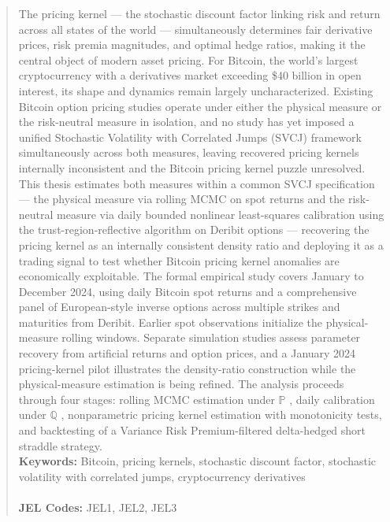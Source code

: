 \begin{abstract}
\noindent 
The pricing kernel — the stochastic discount factor linking risk and return across all states of the world — simultaneously determines fair derivative prices, risk premia magnitudes, and optimal hedge ratios, making it the central object of modern asset pricing. For Bitcoin, the world's largest cryptocurrency with a derivatives market exceeding \$40 billion in open interest, its shape and dynamics remain largely uncharacterized. Existing Bitcoin option pricing studies operate under either the physical measure or the risk-neutral measure in isolation, and no study has yet imposed a unified Stochastic Volatility with Correlated Jumps (SVCJ) framework simultaneously across both measures, leaving recovered pricing kernels internally inconsistent and the Bitcoin pricing kernel puzzle unresolved. This thesis estimates both measures within a common SVCJ specification — the physical measure via rolling MCMC on spot returns and the risk-neutral measure via daily bounded nonlinear least-squares calibration using the trust-region-reflective algorithm on Deribit options — recovering the pricing kernel as an internally consistent density ratio and deploying it as a trading signal to test whether Bitcoin pricing kernel anomalies are economically exploitable. The formal empirical study covers January to December 2024, using daily Bitcoin spot returns and a comprehensive panel of European-style inverse options across multiple strikes and maturities from Deribit. Earlier spot observations initialize the physical-measure rolling windows. Separate simulation studies assess parameter recovery from artificial returns and option prices, and a January 2024 pricing-kernel pilot illustrates the density-ratio construction while the physical-measure estimation is being refined. The analysis proceeds through four stages: rolling MCMC estimation under $\mathbb{P}$
, daily calibration under $\mathbb{Q}$
, nonparametric pricing kernel estimation with monotonicity tests, and backtesting of a Variance Risk Premium-filtered delta-hedged short straddle strategy.
\vspace{0in}\\
\noindent\textbf{Keywords:} Bitcoin, pricing kernels, stochastic discount factor, stochastic volatility with correlated jumps, cryptocurrency derivatives\\
\vspace{0in}\\
\noindent\textbf{JEL Codes:} JEL1, JEL2, JEL3\\

\bigskip
\end{abstract}
